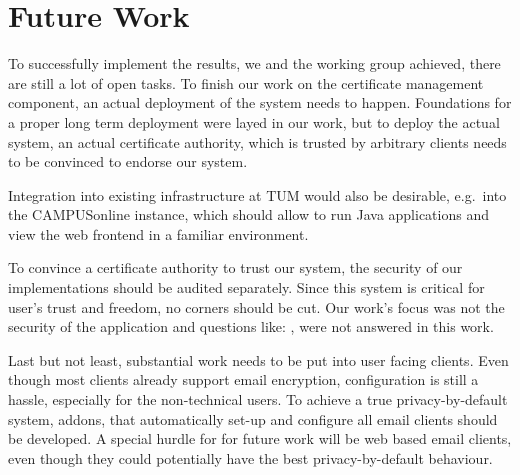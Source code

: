 \chapter{Future Work}\label{ch:futureWork}
To successfully implement the results, we and the working group  achieved, there are still a lot of
open tasks.
To finish our work on the certificate management component, an actual deployment of the system needs to happen.
Foundations for a proper long term deployment were layed in our work, but to deploy the actual system,
an actual certificate authority, which is trusted by arbitrary clients needs to be convinced to endorse our system.

Integration into existing infrastructure at TUM would also be desirable, e.g.\ into the CAMPUSonline instance, which
should allow to run Java applications and view the web frontend in a familiar environment.

To convince a certificate authority to trust our system, the security of our implementations should be audited
separately.
Since this system is critical for user's trust and freedom, no corners should be cut.
Our work's focus was not the security of the application and questions like: , were not answered in this work.

Last but not least, substantial work needs to be put into user facing clients.
Even though most clients already support email encryption, configuration is still a hassle, especially for the
non-technical users.
To achieve a true privacy-by-default system, addons, that automatically set-up and configure all email clients should be
developed.
A special hurdle for for future work will be web based email clients, even though they could potentially have the best
privacy-by-default behaviour.

\pagestyle{thesischapter}
\cleardoublepage
{}
\printbibliography[heading=bibintoc]
